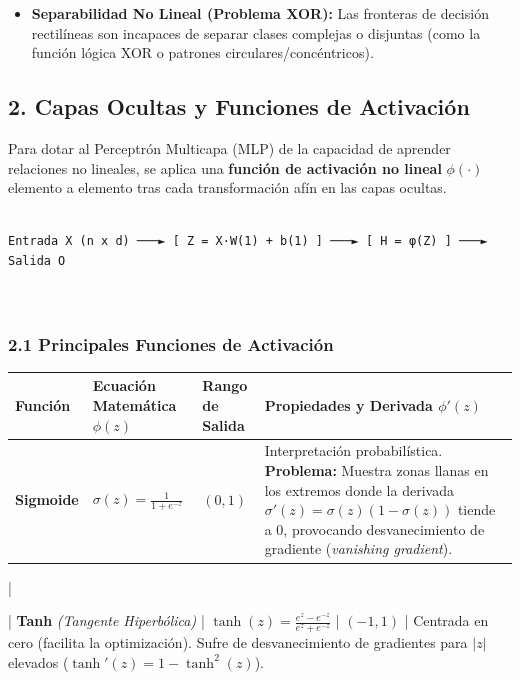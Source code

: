 \documentclass[11pt,oneside]{article}
\begin{document}
\begin{itemize}

\item \textbf{Separabilidad No Lineal (Problema XOR):} Las fronteras de decisión rectilíneas son incapaces de separar clases complejas o disjuntas (como la función lógica XOR o patrones circulares/concéntricos).

\end{itemize}

\subsection{2. Capas Ocultas y Funciones de Activación}

Para dotar al Perceptrón Multicapa (MLP) de la capacidad de aprender relaciones no lineales, se aplica una \textbf{función de activación no lineal} \(\phi(\cdot)\) elemento a elemento tras cada transformación afín en las capas ocultas.

\begin{lstlisting}

Entrada X (n x d) ───► [ Z = X·W(1) + b(1) ] ───► [ H = φ(Z) ] ───► Salida O



\end{lstlisting}

\subsubsection{2.1 Principales Funciones de Activación}

\begin{center}
\begin{tabularx}{\textwidth}{>{\raggedright\arraybackslash}X >{\raggedright\arraybackslash}X >{\raggedright\arraybackslash}X >{\raggedright\arraybackslash}X}
\toprule
Función & Ecuación Matemática \(\phi(z)\) & Rango de Salida & Propiedades y Derivada \(\phi'(z)\) \\
\midrule
\textbf{Sigmoide} & \(\sigma(z) = \frac{1}{1 + e^{-z}}\) & \((0, 1)\) & Interpretación probabilística. \textbf{Problema:} Muestra zonas llanas en los extremos donde la derivada \(\sigma'(z) = \sigma(z)(1 - \sigma(z))\) tiende a 0, provocando desvanecimiento de gradiente (\emph{vanishing gradient}). \\
\bottomrule
\end{tabularx}
\end{center}

 |

| \textbf{Tanh} \emph{(Tangente Hiperbólica)} | \(\tanh(z) = \frac{e^z - e^{-z}}{e^z + e^{-z}}\) | \((-1, 1)\) | Centrada en cero (facilita la optimización). Sufre de desvanecimiento de gradientes para \(\vert{}z\vert{}\) elevados (\(\tanh'(z) = 1 - \tanh^2(z)\)).
\end{document}

